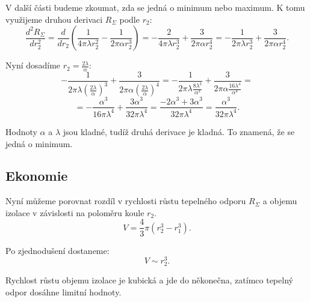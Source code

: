 \documentclass{article}
\begin{document}
V další části budeme zkoumat, zda se jedná o minimum nebo maximum. K tomu využijeme druhou derivaci $R_\Sigma$ podle $r_2$:
$$
    \frac{d^2R_\Sigma}{dr_2^2} = \frac{d}{dr_2} \left( \frac{1}{4 \pi \lambda r_2^2} - \frac{1}{2 \pi \alpha r_2^3} \right) = -\frac{2}{4 \pi \lambda r_2^3} + \frac{3}{2 \pi \alpha r_2^4} = - \frac{1}{2 \pi \lambda r_2^3} + \frac{3}{2 \pi \alpha r_2^4}.
$$

Nyní dosadíme $r_2 = \frac{2 \lambda}{\alpha}$:
$$
    -\frac{1}{2 \pi \lambda \left( \frac{2 \lambda}{\alpha} \right)^3} + \frac{3}{2 \pi \alpha \left( \frac{2 \lambda}{\alpha} \right)^4} = -\frac{1}{2 \pi \lambda \frac{8 \lambda^3}{\alpha^3}} + \frac{3}{2 \pi \alpha \frac{16 \lambda^4}{\alpha^4}} =
$$
$$
    = -\frac{\alpha^3}{16 \pi \lambda^4} + \frac{3 \alpha^3}{32 \pi \lambda^4} = \frac{-2 \alpha^3 + 3 \alpha^3}{32 \pi \lambda^4} = \frac{\alpha^3}{32 \pi \lambda^4}.
$$

Hodnoty $\alpha$ a $\lambda$ jsou kladné, tudíž druhá derivace je kladná. To znamená, že se jedná o minimum.
\begin{center}
\end{center}



\subsection{Ekonomie}
Nyní můžeme porovnat rozdíl v rychlosti růstu tepelného odporu $R_\Sigma$ a objemu izolace v závislosti na poloměru koule $r_2$.
$$
    V = \frac{4}{3} \pi (r_2^3 - r_1^3).
$$

Po zjednodušení dostaneme:
$$
    V \sim r_2^3.
$$

Rychlost růstu objemu izolace je kubická a jde do někonečna, zatímco tepelný odpor dosáhne limitní hodnoty.
\end{document}
